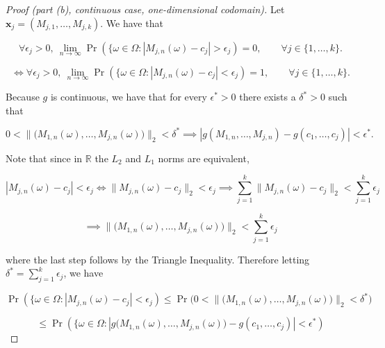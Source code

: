 \begin{proof}[Proof (part (b), continuous case, one-dimensional codomain)] Let \(\boldsymbol{x}_j = (M_{j,1}, \ldots, M_{j,k})\). We have that

\[
\forall \epsilon_j > 0, \ \lim_{n \to \infty} \Pr(\{\omega \in \Omega : |M_{j,n}(\omega) - c_j| > \epsilon_j) = 0, \qquad \forall j \in \{1, \ldots, k\}.
\]

\begin{equation}\label{mathstats.541a.hw7.1a}
\iff \forall \epsilon_j > 0, \ \lim_{n \to \infty} \Pr(\{\omega \in \Omega : |M_{j,n}(\omega) - c_j| < \epsilon_j) = 1, \qquad \forall j \in \{1, \ldots, k\}.
\end{equation}

Because \(g\) is continuous, we have that for every \(\epsilon^* > 0\) there exists a \(\delta^* > 0\) such that


\begin{equation}\label{mathstats.541a.hw7.1c}
0 < \lVert (M_{1,n}(\omega),\ldots,M_{j,n}(\omega) \big) \rVert_2 < \delta^* \implies |  g(M_{1,n},\ldots,M_{j,n}) - g(c_1, \ldots, c_j)| < \epsilon^*.
\end{equation}

Note that since in \(\mathbb{R}\) the \(L_2\) and \(L_1\) norms are equivalent,

\[
 |M_{j,n}(\omega) - c_j| < \epsilon_j \iff  \lVert M_{j,n}(\omega) - c_j\rVert_2 < \epsilon_j  \implies \sum_{j=1}^k   \lVert M_{j,n}(\omega) - c_j\rVert_2  < \sum_{j=1}^k \epsilon_j 
 \]
 
\[
\implies \lVert (M_{1,n}(\omega),\ldots,M_{j,n}(\omega) \big) \rVert_2 <  \sum_{j=1}^k \epsilon_j 
\]

%

where the last step follows by the Triangle Inequality. Therefore letting \(\delta^* =  \sum_{j=1}^k \epsilon_j \), we have

\[
\Pr(\{\omega \in \Omega : |M_{j,n}(\omega) - c_j| < \epsilon_j)  \leq \Pr \big(0 < \lVert (M_{1,n}(\omega),\ldots,M_{j,n}(\omega) \big) \rVert_2 < \delta^*  \big)
\]

\[
 \leq \Pr(\{\omega \in \Omega : |g\big(M_{1,n}(\omega),\ldots,M_{j,n}(\omega) \big)- g(c_1, \ldots, c_j)| < \epsilon^*)
\]


\end{proof}
